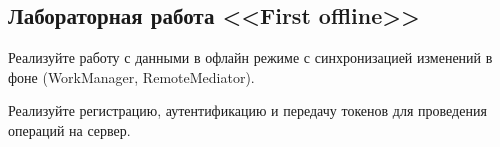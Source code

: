 \subsection{Лабораторная работа <<First offline>> }

Реализуйте работу с данными в офлайн режиме с синхронизацией изменений в фоне (WorkManager, RemoteMediator).

Реализуйте регистрацию, аутентификацию и передачу токенов для проведения операций на сервер.

